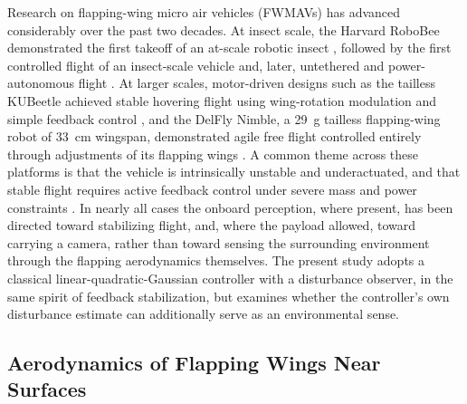 \documentclass[final,5p,times]{elsarticle}
\begin{document}
Research on flapping-wing micro air vehicles (FWMAVs) has advanced considerably over the past two decades. At insect scale, the Harvard RoboBee demonstrated the first takeoff of an at-scale robotic insect \cite{wood2008first}, followed by the first controlled flight of an insect-scale vehicle \cite{ma2013controlled} and, later, untethered and power-autonomous flight \cite{jafferis2019untethered}. At larger scales, motor-driven designs such as the tailless KUBeetle achieved stable hovering flight using wing-rotation modulation and simple feedback control \cite{phan2017design}, and the DelFly Nimble, a 29~g tailless flapping-wing robot of 33~cm wingspan, demonstrated agile free flight controlled entirely through adjustments of its flapping wings \cite{karasek2018tailless}. A common theme across these platforms is that the vehicle is intrinsically unstable and underactuated, and that stable flight requires active feedback control under severe mass and power constraints \cite{phan2017design, karasek2018tailless}. In nearly all cases the onboard perception, where present, has been directed toward stabilizing flight, and, where the payload allowed, toward carrying a camera, rather than toward sensing the surrounding environment through the flapping aerodynamics themselves. The present study adopts a classical linear-quadratic-Gaussian controller with a disturbance observer, in the same spirit of feedback stabilization, but examines whether the controller's own disturbance estimate can additionally serve as an environmental sense.

\subsection{Aerodynamics of Flapping Wings Near Surfaces}
\label{sec:rw_groundeffect}
\end{document}
